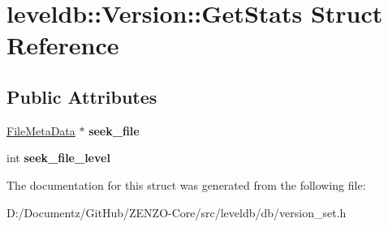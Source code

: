 \hypertarget{structleveldb_1_1_version_1_1_get_stats}{}\section{leveldb\+::Version\+::Get\+Stats Struct Reference}
\label{structleveldb_1_1_version_1_1_get_stats}
\subsection*{Public Attributes}
\begin{DoxyCompactItemize}
\item 
\mbox{\label{structleveldb_1_1_version_1_1_get_stats_a8c677e9a2d5bc48a5bcc40e07dd2cca7}} 
\mbox{\hyperlink{structleveldb_1_1_file_meta_data}{File\+Meta\+Data}} $\ast$ {\bfseries seek\+\_\+file}
\item 
\mbox{\label{structleveldb_1_1_version_1_1_get_stats_a6cd952d5850faf00c7d45f79973a76d4}} 
int {\bfseries seek\+\_\+file\+\_\+level}
\end{DoxyCompactItemize}


The documentation for this struct was generated from the following file\+:\begin{DoxyCompactItemize}
\item 
D\+:/\+Documentz/\+Git\+Hub/\+Z\+E\+N\+Z\+O-\/\+Core/src/leveldb/db/version\+\_\+set.\+h\end{DoxyCompactItemize}
